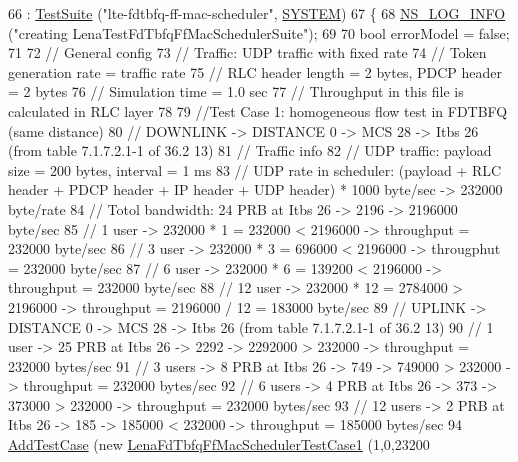 \begin{DoxyCode}
66   : \hyperlink{classns3_1_1TestSuite_a904b0c40583b744d30908aeb94636d1a}{TestSuite} (\textcolor{stringliteral}{"lte-fdtbfq-ff-mac-scheduler"}, \hyperlink{classns3_1_1TestSuite_a1ebfcab34ec8161e085e8e3a1855eae0a90c5529a26ab3a5ffcc6e57040dbd82e}{SYSTEM})
67 \{
68   \hyperlink{group__logging_gafbd73ee2cf9f26b319f49086d8e860fb}{NS\_LOG\_INFO} (\textcolor{stringliteral}{"creating LenaTestFdTbfqFfMacSchedulerSuite"});
69 
70   \textcolor{keywordtype}{bool} errorModel = \textcolor{keyword}{false};
71 
72   \textcolor{comment}{// General config}
73   \textcolor{comment}{// Traffic: UDP traffic with fixed rate}
74   \textcolor{comment}{// Token generation rate = traffic rate}
75   \textcolor{comment}{// RLC header length = 2 bytes, PDCP header = 2 bytes}
76   \textcolor{comment}{// Simulation time = 1.0 sec}
77   \textcolor{comment}{// Throughput in this file is calculated in RLC layer}
78 
79   \textcolor{comment}{//Test Case 1: homogeneous flow test in FDTBFQ (same distance)}
80   \textcolor{comment}{// DOWNLINK -> DISTANCE 0 -> MCS 28 -> Itbs 26 (from table 7.1.7.2.1-1 of 36.2    13)}
81   \textcolor{comment}{// Traffic info}
82   \textcolor{comment}{//   UDP traffic: payload size = 200 bytes, interval = 1 ms}
83   \textcolor{comment}{//   UDP rate in scheduler: (payload + RLC header + PDCP header + IP header + UDP header) * 1000 byte/sec
       -> 232000 byte/rate }
84   \textcolor{comment}{// Totol bandwidth: 24 PRB at Itbs 26 -> 2196 -> 2196000 byte/sec}
85   \textcolor{comment}{// 1 user -> 232000 * 1 = 232000 < 2196000 -> throughput = 232000 byte/sec}
86   \textcolor{comment}{// 3 user -> 232000 * 3 = 696000 < 2196000 -> througphut = 232000 byte/sec}
87   \textcolor{comment}{// 6 user -> 232000 * 6 = 139200 < 2196000 -> throughput = 232000 byte/sec}
88   \textcolor{comment}{// 12 user -> 232000 * 12 = 2784000 > 2196000 -> throughput = 2196000 / 12 = 183000 byte/sec}
89   \textcolor{comment}{// UPLINK -> DISTANCE 0 -> MCS 28 -> Itbs 26 (from table 7.1.7.2.1-1 of 36.2    13)}
90   \textcolor{comment}{// 1 user -> 25 PRB at Itbs 26 -> 2292 -> 2292000 > 232000 -> throughput = 232000 bytes/sec}
91   \textcolor{comment}{// 3 users -> 8 PRB at Itbs 26 -> 749 -> 749000 > 232000 -> throughput = 232000 bytes/sec }
92   \textcolor{comment}{// 6 users -> 4 PRB at Itbs 26 -> 373 -> 373000 > 232000 -> throughput = 232000 bytes/sec}
93   \textcolor{comment}{// 12 users -> 2 PRB at Itbs 26 -> 185 -> 185000 < 232000 -> throughput = 185000 bytes/sec}
94   \hyperlink{classns3_1_1TestCase_a3718088e3eefd5d6454569d2e0ddd835}{AddTestCase} (\textcolor{keyword}{new} \hyperlink{classLenaFdTbfqFfMacSchedulerTestCase1}{LenaFdTbfqFfMacSchedulerTestCase1} (1,0,23200

\end{DoxyCode}
